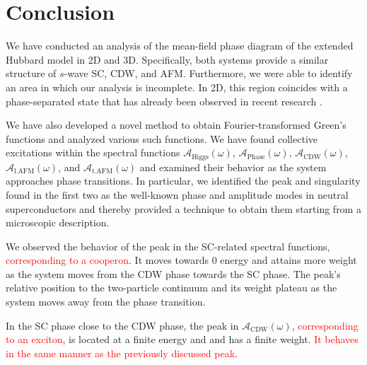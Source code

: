 \documentclass[
    reprint, 
    aps,
    preprintnumbers,
    twocolumn,
    prb,
    superscriptaddress
]{revtex4-2}
\newcommand{\spectral}[1]{\mathcal{A}_\text{#1}  (\omega)}
\newcommand{\markEdited}{red}
\begin{document}

\section{Conclusion}\label{sec:conclusion}


We have conducted an analysis of the mean-field phase diagram of the extended Hubbard model in 2D and 3D. 
Specifically, both systems provide a similar structure of $s$-wave SC, CDW, and AFM.
Furthermore, we were able to identify an area in which our analysis is incomplete.
In 2D, this region coincides with a phase-separated state that has already been observed in recent research \cite{Linner23}.

We have also developed a novel method to obtain Fourier-transformed Green's functions and analyzed various such functions. 
We have found collective excitations within the spectral functions $\spectral{Higgs}$, $\spectral{Phase}$, $\spectral{CDW}$, $\spectral{l.AFM}$, and $\spectral{t.AFM}$ 
and examined their behavior as the system approaches phase transitions. 
In particular, we identified the peak and singularity found in the first two as the well-known phase and amplitude modes in neutral superconductors 
and thereby provided a technique to obtain them starting from a microscopic description.

We observed the behavior of the peak in the SC-related spectral functions, \textcolor{\markEdited}{corresponding to a cooperon}.
It moves towards 0 energy and attains more weight as the system moves from the CDW phase towards the SC phase. 
The peak's relative position to the two-particle continuum and its weight plateau as the system moves away from the phase transition.

In the SC phase close to the CDW phase, the peak in $\spectral{CDW}$, \textcolor{\markEdited}{corresponding to an exciton}, is located at a finite energy and and has a finite weight. 
\textcolor{\markEdited}{It behaves in the same manner as the previously discussed peak}.
\end{document}
